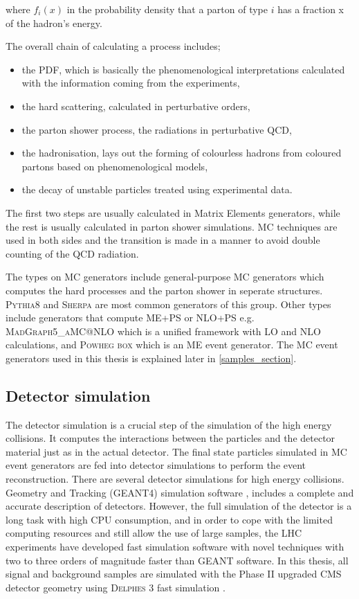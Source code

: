 where $f_i(x)$ in the probability density that a parton of type $i$ has a fraction x of the hadron's energy.

The overall chain of calculating a process includes;
\begin{itemize}
    \item the PDF, which is basically the phenomenological interpretations calculated with the information coming from the experiments,
    \item the hard scattering, calculated in perturbative orders,
    \item the parton shower process, the radiations in perturbative QCD,
    \item the hadronisation, lays out the forming of colourless hadrons from coloured partons based on phenomenological models,
    \item the decay of unstable particles treated using experimental data.
\end{itemize}
The first two steps are usually calculated in Matrix Elements generators, while the rest is usually calculated in parton shower simulations. MC techniques are used in both sides and the transition is made in a manner to avoid double counting of the QCD radiation.

The types on MC generators include general-purpose MC generators which computes the hard processes and the parton shower in seperate structures. \textsc{Pythia8} and \textsc{Sherpa} are most common generators of this group. Other types include generators that compute ME+PS or NLO+PS e.g. \textsc{MadGraph5\_aMC@NLO} which is a unified framework with LO and NLO calculations, and \textsc{Powheg box} which is an ME event generator. The MC event generators used in this thesis is explained later in \autoref{samples_section}.

\subsection{Detector simulation}\label{detector_sim_subsection}

The detector simulation is a crucial step of the simulation of the high energy collisions. It computes the interactions between the particles and the detector material just as in the actual detector. The final state particles simulated in MC event generators are fed into detector simulations to perform the event reconstruction. There are several detector simulations for high energy collisions. Geometry and Tracking (GEANT4) simulation software \cite{Agostinelli2003}, includes a complete and accurate description of detectors. However, the full simulation of the detector is a long task with high CPU consumption, and in order to cope with the limited computing resources and still allow the use of large samples, the LHC experiments have developed fast simulation software with novel techniques \cite{Sekmen:2242542, Lukas:2012kua} with two to three orders of magnitude faster than GEANT software. In this thesis, all signal and background samples are simulated with the Phase II upgraded CMS detector geometry using \textsc{Delphes} 3 fast simulation \cite{Selvaggi:2014mya}.

